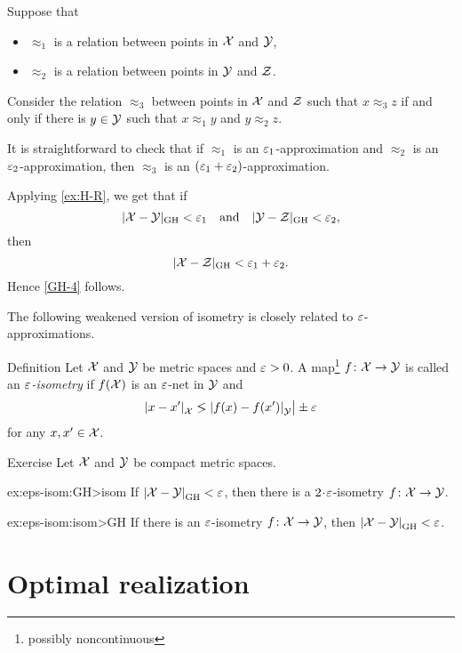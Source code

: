 Suppose that 
\begin{itemize}
\item $\approx_1$ is a relation between points in $\mathcal{X}$ and $\mathcal{Y}$,
\item $\approx_2$ is a relation between points in $\mathcal{Y}$ and $\mathcal{Z}$.
\end{itemize}
Consider the relation $\approx_3$ between points in $\mathcal{X}$ and $\mathcal{Z}$ such that
$x\approx_3 z$ if and only if there is $y\in  \mathcal{Y}$ such that 
$x\approx_1 y$ and $y\approx_2 z$.

It is straightforward to check that if $\approx_1$ is an $\varepsilon_1$-approximation and $\approx_2$ is an $\varepsilon_2$-approximation, then $\approx_3$ is an $(\varepsilon_1+\varepsilon_2)$-approximation.

Applying \ref{ex:H-R}, we get that if 
\[|\mathcal{X}-\mathcal{Y}|_{\operatorname{\rm GH}\nolimits}<\varepsilon_1
\quad\text{and}\quad
|\mathcal{Y}-\mathcal{Z}|_{\operatorname{\rm GH}\nolimits}<\varepsilon_2,
\]
then 
\[|\mathcal{X}-\mathcal{Z}|_{\operatorname{\rm GH}\nolimits}<\varepsilon_1+\varepsilon_2.\]
Hence \ref{GH-4} follows.
\qeds

The following weakened version of isometry is closely related to $\varepsilon$-approximations.

\begin{thm}{Definition} Let $\mathcal{X}$ and $\mathcal{Y}$ be metric spaces and $\varepsilon>0$. 
A  map\footnote{possibly noncontinuous} $f\: \spc{X} \z\to \spc{Y}$ is called an \emph{$\varepsilon$-isometry} 
if $f(\mathcal{X})$ is an $\varepsilon$-net in $\mathcal{Y}$ and
\[\dist{x}{x'}{\spc{X}}\lg\dist{f(x)}{f(x')}{\spc{Y}}\bigr|\pm\eps\]
for any $x,x'\in \mathcal{X}$.
\end{thm}

\begin{thm}{Exercise}\label{ex:eps-isom}
Let $\mathcal{X}$ and $\mathcal{Y}$ be compact metric spaces.

\begin{subthm}{ex:eps-isom:GH>isom}
If $\dist{\spc{X}}{\spc{Y}}{\GH}<\eps$, then there is a $2\cdot\eps$-isometry $f\colon\mathcal{X}\to\mathcal{Y}$.
\end{subthm}

\begin{subthm}{ex:eps-isom:isom>GH}
If there is an $\varepsilon$-isometry $f\colon\mathcal{X}\to\mathcal{Y}$, then $\dist{\spc{X}}{\spc{Y}}{\GH}<\eps$.
\end{subthm}

\end{thm}

\section{Optimal realization}\label{sec:extfun=GH}

